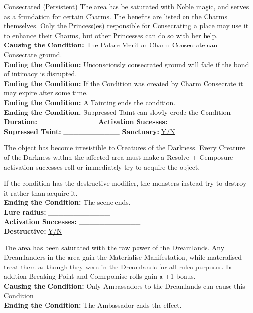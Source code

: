 \documentclass[10pt, frontgrid, backgrid]{flacards}
\begin{document}
\OCond
{Consecrated (Persistent)}
{
The area has be saturated with Noble magic, and serves as a foundation for certain Charms. The benefits are listed on the Charms themselves. Only the Princess(es) responsible for Consecrating a place may use it to enhance their Charms, but other Princesses can do so with her help.\\
\textbf{Causing the Condition:} The Palace Merit or Charm Consecrate can Consecrate ground. \\
\textbf{Ending the Condition:} Unconsciously consecrated ground will fade if the bond of intimacy is disrupted. \\
\textbf{Ending the Condition:} If the Condition was created by Charm Consecrate it may expire after some time. \\
\textbf{Ending the Condition:} A Tainting ends the condition. \\
\textbf{Ending the Condition:} Suppressed Taint can slowly erode the Condition. \\
\textbf{Duration:}  \_\_\_\_\_\_\_\_\_\_\_ \textbf{Activation Sucesses:} \_\_\_\_\_\_\_\_\_\_\_\\
\textbf{Supressed Taint:} \_\_\_\_\_\_\_\_\_\_\_ \textbf{Sanctuary:} \underline{Y/N} }

{The object has become irresistible to Creatures of the Darkness. Every Creature of the Darkness within the affected area must make a Resolve + Composure - activation successes roll or immediately try to acquire the object. 

If the condition has the destructive modifier, the monsters instead try to destroy it rather than acquire it. \\

\textbf{Ending the Condition:} The scene ends. \\
\textbf{Lure radius:} \_\_\_\_\_\_\_\_\_\_\_\_ \\
\textbf{Activation Successes:} \_\_\_\_\_\_\_\_\_\_\_\_ \\
\textbf{Destructive:} \underline{Y/N} }

{The area has been saturated with the raw power of the Dreamlands. Any Dreamlanders in the area gain the Materialise Manifestation, while materalised treat them as though they were in the Dreamlands for all rules purposes. In addtion Breaking Point and Comrpomise rolls gain a +1 bonus.\\
\textbf{Causing the Condition:} Only Ambassadors to the Dreamlands can cause this Condition\\
\textbf{Ending the Condition:} The Ambassador ends the effect. }
\end{document}
